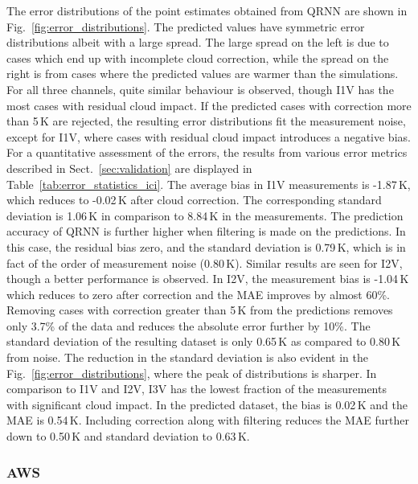 \documentclass[amt, manuscript]{copernicus}
\begin{document}
The error distributions of the point estimates obtained from QRNN are shown in Fig.~\ref{fig:error_distributions}. The predicted values have symmetric error distributions albeit with a large spread. The large spread on the left is due to cases which end up with incomplete cloud correction, while the spread on the right is from cases where the predicted values are warmer than the simulations. For all three channels, quite similar behaviour is observed, though I1V has the most cases with residual cloud impact. If the predicted cases with correction more than 5\,K are rejected, the resulting error distributions fit the measurement noise, except for I1V, where cases with residual cloud impact introduces a negative bias. For a quantitative assessment of the errors, the results from various error metrics described in  Sect.~\ref{sec:validation} are displayed in Table~\ref{tab:error_statistics_ici}. The average bias in I1V measurements is -1.87\,K, which reduces to -0.02\,K after cloud correction. The corresponding standard deviation is 1.06\,K in comparison to 8.84\,K in the measurements. The prediction accuracy of QRNN is further higher when filtering is made on the predictions. In this case, the residual bias zero, and the standard deviation is 0.79\,K, which is in fact of the order of measurement noise (0.80\,K). Similar results are seen for I2V, though a better performance is observed. In I2V, the measurement bias is -1.04\,K which reduces to zero after correction and the MAE improves by almost 60\%. Removing cases with correction greater than 5\,K from the predictions removes only 3.7\% of the data and reduces the absolute error further by 10\%. The standard deviation of the resulting dataset is only 0.65\,K as compared to 0.80\,K from noise. The reduction in the standard deviation is also evident in the Fig.~\ref{fig:error_distributions}, where the peak of distributions is sharper. In comparison to I1V and I2V, I3V has the lowest fraction of the measurements with significant cloud impact. In the predicted dataset, the bias is 0.02\,K and the MAE is 0.54\,K. Including correction along with filtering reduces the MAE further down to 0.50\,K and standard deviation to 0.63\,K.  

\subsubsection{AWS}
\end{document}
